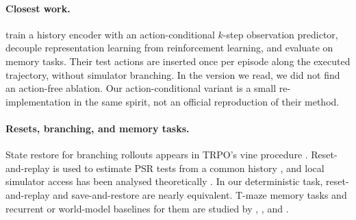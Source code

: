 \paragraph{Closest work.}
\citet{kwon2024future} train a history encoder with an action-conditional $k$-step observation predictor, decouple representation learning from reinforcement learning, and evaluate on memory tasks. Their test actions are inserted once per episode along the executed trajectory, without simulator branching. In the version we read, we did not find an action-free ablation. Our action-conditional variant is a small re-implementation in the same spirit, not an official reproduction of their method.

\paragraph{Resets, branching, and memory tasks.}
State restore for branching rollouts appears in TRPO's vine procedure \citep{schulman2015trpo}. Reset-and-replay is used to estimate PSR tests from a common history \citep{james2004reset}, and local simulator access has been analysed theoretically \citep{mhammedi2024resets}. In our deterministic task, reset-and-replay and save-and-restore are nearly equivalent. T-maze memory tasks and recurrent or world-model baselines for them are studied by \citet{ni2022recurrent}, \citet{ni2023transformers}, and \citet{samsami2024r2i}.
